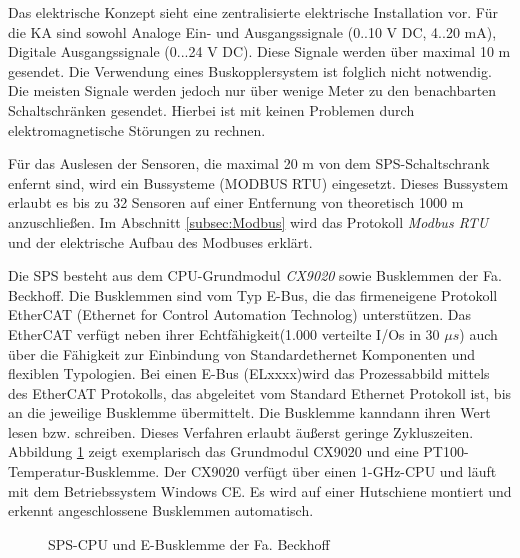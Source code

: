 Das elektrische Konzept sieht eine zentralisierte elektrische Installation vor. Für die KA sind sowohl Analoge Ein- und Ausgangssignale (0..10 V DC, 4..20 mA), Digitale Ausgangssignale (0...24 V DC). Diese Signale werden über maximal 10 m gesendet. Die Verwendung eines Buskopplersystem ist folglich nicht notwendig. Die meisten Signale werden jedoch nur über wenige Meter zu den benachbarten Schaltschränken gesendet. Hierbei ist mit keinen Problemen durch elektromagnetische Störungen zu rechnen. 

Für das Auslesen der Sensoren, die maximal  20 m von dem SPS-Schaltschrank enfernt sind, wird ein Bussysteme (MODBUS RTU) eingesetzt. Dieses Bussystem erlaubt es bis zu 32 Sensoren auf einer Entfernung von theoretisch 1000 m anzuschließen. Im Abschnitt \ref{subsec:Modbus} wird das Protokoll \textit{Modbus RTU} und der elektrische Aufbau des Modbuses erklärt. 
 
Die SPS besteht aus dem CPU-Grundmodul \textit{CX9020} sowie Busklemmen der Fa. Beckhoff. Die Busklemmen sind vom Typ E-Bus, die das firmeneigene Protokoll EtherCAT (Ethernet for Control Automation Technolog) unterstützen.  Das EtherCAT verfügt neben ihrer Echtfähigkeit(1.000 verteilte I/Os in 30 $\mu s$\citep{Beckhoff2016}) auch über die Fähigkeit zur Einbindung von  Standardethernet Komponenten und flexiblen Typologien. Bei einen E-Bus (ELxxxx)wird das Prozessabbild mittels des EtherCAT
Protokolls, das abgeleitet vom Standard Ethernet Protokoll ist, bis an die jeweilige Busklemme übermittelt. Die Busklemme kanndann ihren Wert lesen bzw. schreiben. Dieses Verfahren erlaubt äußerst geringe Zykluszeiten. Abbildung \ref{fig:Beckhoffklemmen} zeigt exemplarisch das Grundmodul CX9020 und eine PT100-Temperatur-Busklemme. Der CX9020 verfügt über einen 1-GHz-CPU und läuft mit dem Betriebssystem Windows CE. Es wird auf einer Hutschiene montiert und erkennt angeschlossene Busklemmen automatisch. 

\begin{figure}[htb]
\centering
{}
\caption{SPS-CPU und E-Busklemme der Fa. Beckhoff}
\label{fig:Beckhoffklemmen}
\end{figure}


